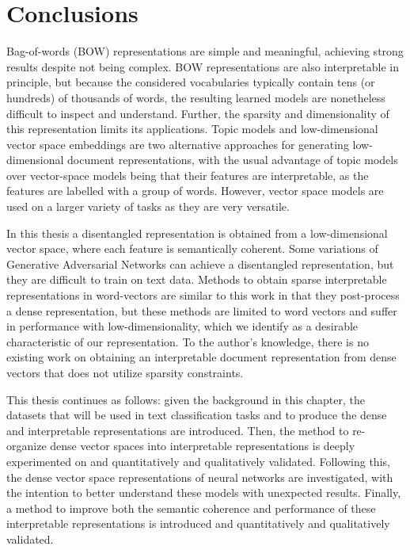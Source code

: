 

\section{Conclusions}

 Bag-of-words (BOW) representations are simple and meaningful, achieving strong results despite not being complex. BOW representations are also interpretable in principle, but because the considered vocabularies typically contain tens (or hundreds) of thousands of words, the resulting learned models are nonetheless difficult to inspect and understand. Further, the sparsity and dimensionality of this representation limits its applications. Topic models and low-dimensional vector space embeddings are two alternative approaches for generating low-dimensional document representations, with the usual advantage of topic models over vector-space models being that their features are interpretable, as the features are labelled with a group of words. However, vector space models are used on a larger variety of tasks as they are very versatile. %

In this thesis a  disentangled representation is obtained from a low-dimensional vector space, where each feature is semantically coherent. Some variations of Generative Adversarial Networks can achieve a disentangled representation, but they are difficult to train on text data. Methods to obtain sparse interpretable representations in word-vectors are similar to this work in that they post-process a dense representation, but these methods are limited to word vectors and suffer in performance with low-dimensionality, which we identify as a desirable characteristic of our representation. To the author's knowledge, there is no existing work on obtaining an interpretable document representation from dense vectors that does not utilize sparsity constraints.

This thesis continues as follows: given the background in this chapter, the datasets that will be used in text classification tasks and to produce the dense and interpretable representations are introduced. Then, the method to re-organize dense vector spaces into interpretable representations is deeply experimented on and quantitatively and qualitatively validated. Following this, the dense vector space representations of neural networks are investigated, with the intention to better understand these models with unexpected results. Finally, a method to improve both the semantic coherence and performance of these  interpretable representations  is introduced and quantitatively and qualitatively validated. 

